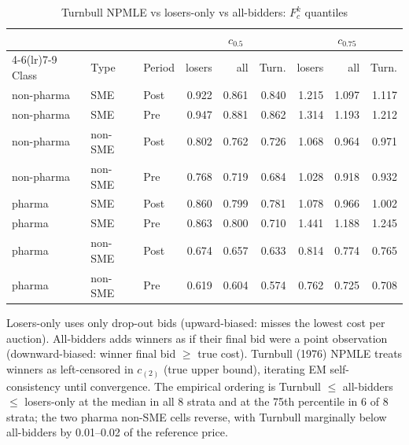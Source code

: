 \begin{table}[htbp]
\centering
\begin{threeparttable}
\caption{Turnbull NPMLE vs losers-only vs all-bidders: $F_c^k$ quantiles}
\label{tab:v3_turnbull_fc}
\small
\begin{tabular}{lllrrrrrr}
\toprule
 & & & \multicolumn{3}{c}{$c_{0.5}$} & \multicolumn{3}{c}{$c_{0.75}$} \\
\cmidrule(lr){4-6}\cmidrule(lr){7-9}
Class & Type & Period & losers & all & Turn. & losers & all & Turn. \\
\midrule
non-pharma & SME & Post & 0.922 & 0.861 & 0.840 & 1.215 & 1.097 & 1.117 \\
non-pharma & SME & Pre & 0.947 & 0.881 & 0.862 & 1.314 & 1.193 & 1.212 \\
non-pharma & non-SME & Post & 0.802 & 0.762 & 0.726 & 1.068 & 0.964 & 0.971 \\
non-pharma & non-SME & Pre & 0.768 & 0.719 & 0.684 & 1.028 & 0.918 & 0.932 \\
pharma & SME & Post & 0.860 & 0.799 & 0.781 & 1.078 & 0.966 & 1.002 \\
pharma & SME & Pre & 0.863 & 0.800 & 0.710 & 1.441 & 1.188 & 1.245 \\
pharma & non-SME & Post & 0.674 & 0.657 & 0.633 & 0.814 & 0.774 & 0.765 \\
pharma & non-SME & Pre & 0.619 & 0.604 & 0.574 & 0.762 & 0.725 & 0.708 \\
\bottomrule
\end{tabular}
\begin{tablenotes}\footnotesize
\item Losers-only uses only drop-out bids (upward-biased: misses
the lowest cost per auction). All-bidders adds winners as if
their final bid were a point observation (downward-biased: winner
final bid $\ge$ true cost). Turnbull (1976) NPMLE treats winners
as left-censored in $c_{(2)}$ (true upper bound), iterating EM
self-consistency until convergence. The empirical ordering is
Turnbull $\le$ all-bidders $\le$ losers-only at the median in all
8 strata and at the 75th percentile in 6 of 8 strata; the two
pharma non-SME cells reverse, with Turnbull marginally below
all-bidders by 0.01--0.02 of the reference price.
\end{tablenotes}
\end{threeparttable}
\end{table}
